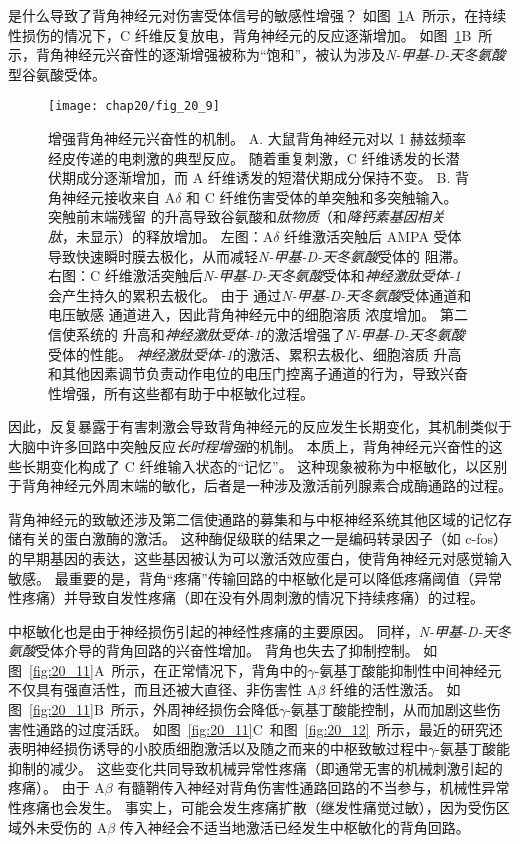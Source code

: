 是什么导致了背角神经元对伤害受体信号的敏感性增强？
如图~\ref{fig:20_10}A~所示，在持续性损伤的情况下，C 纤维反复放电，背角神经元的反应逐渐增加。
如图~\ref{fig:20_10}B~所示，背角神经元兴奋性的逐渐增强被称为“饱和”，被认为涉及\textit{N-甲基-D-天冬氨酸}型谷氨酸受体。


\begin{figure}[htbp]
	\centering
	\texttt{[image: chap20/fig\_20\_9]}
	\caption{增强背角神经元兴奋性的机制。
		A. 大鼠背角神经元对以 1 赫兹频率经皮传递的电刺激的典型反应。
		随着重复刺激，C 纤维诱发的长潜伏期成分逐渐增加，而 A 纤维诱发的短潜伏期成分保持不变。
		B. 背角神经元接收来自 A$\delta$ 和 C 纤维伤害受体的单突触和多突触输入。
		突触前末端残留  的升高导致谷氨酸和\textit{肽物质}（和\textit{降钙素基因相关肽}，未显示）的释放增加。
		左图：A$\delta$ 纤维激活突触后 AMPA 受体导致快速瞬时膜去极化，从而减轻\textit{N-甲基-D-天冬氨酸}受体的  阻滞。
		右图：C 纤维激活突触后\textit{N-甲基-D-天冬氨酸}受体和\textit{神经激肽受体-1}会产生持久的累积去极化。
		由于  通过\textit{N-甲基-D-天冬氨酸}受体通道和电压敏感  通道进入，因此背角神经元中的细胞溶质  浓度增加。
		第二信使系统的  升高和\textit{神经激肽受体-1}的激活增强了\textit{N-甲基-D-天冬氨酸}受体的性能。
		\textit{神经激肽受体-1}的激活、累积去极化、细胞溶质  升高和其他因素调节负责动作电位的电压门控离子通道的行为，导致兴奋性增强，所有这些都有助于中枢敏化过程。}
	\label{fig:20_10}
\end{figure}


因此，反复暴露于有害刺激会导致背角神经元的反应发生长期变化，其机制类似于大脑中许多回路中突触反应\textit{长时程增强}的机制。
本质上，背角神经元兴奋性的这些长期变化构成了 C 纤维输入状态的“记忆”。
这种现象被称为中枢敏化，以区别于背角神经元外周末端的敏化，后者是一种涉及激活前列腺素合成酶通路的过程。


背角神经元的致敏还涉及第二信使通路的募集和与中枢神经系统其他区域的记忆存储有关的蛋白激酶的激活。
这种酶促级联的结果之一是编码转录因子（如 c-fos）的早期基因的表达，这些基因被认为可以激活效应蛋白，使背角神经元对感觉输入敏感。
最重要的是，背角“疼痛”传输回路的中枢敏化是可以降低疼痛阈值（异常性疼痛）并导致自发性疼痛（即在没有外周刺激的情况下持续疼痛）的过程。


中枢敏化也是由于神经损伤引起的神经性疼痛的主要原因。
同样，\textit{N-甲基-D-天冬氨酸}受体介导的背角回路的兴奋性增加。
背角也失去了抑制控制。
如图~\ref{fig:20_11}A~所示，在正常情况下，背角中的$\gamma$-氨基丁酸能抑制性中间神经元不仅具有强直活性，而且还被大直径、非伤害性 A$ \beta $ 纤维的活性激活。
如图~\ref{fig:20_11}B~所示，外周神经损伤会降低$\gamma$-氨基丁酸能控制，从而加剧这些伤害性通路的过度活跃。
如图~\ref{fig:20_11}C~和图~\ref{fig:20_12}~所示，最近的研究还表明神经损伤诱导的小胶质细胞激活以及随之而来的中枢致敏过程中$\gamma$-氨基丁酸能抑制的减少。
这些变化共同导致机械异常性疼痛（即通常无害的机械刺激引起的疼痛）。
由于 A$ \beta $ 有髓鞘传入神经对背角伤害性通路回路的不当参与，机械性异常性疼痛也会发生。
事实上，可能会发生疼痛扩散（继发性痛觉过敏），因为受伤区域外未受伤的 A$ \beta $ 传入神经会不适当地激活已经发生中枢敏化的背角回路。


